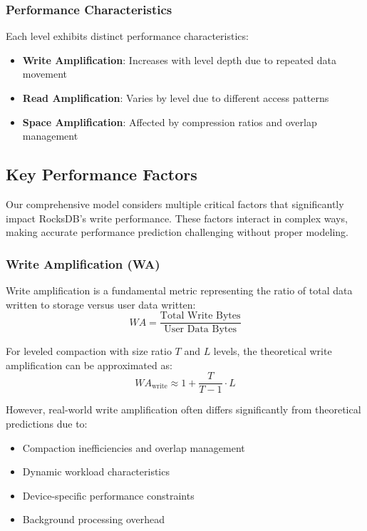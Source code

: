 \documentclass[11pt]{article}
\begin{document}
\subsubsection{Performance Characteristics}
Each level exhibits distinct performance characteristics:
\begin{itemize}
    \item \textbf{Write Amplification}: Increases with level depth due to repeated data movement
    \item \textbf{Read Amplification}: Varies by level due to different access patterns
    \item \textbf{Space Amplification}: Affected by compression ratios and overlap management
\end{itemize}

\subsection{Key Performance Factors}

Our comprehensive model considers multiple critical factors that significantly impact RocksDB's write performance. These factors interact in complex ways, making accurate performance prediction challenging without proper modeling.

\subsubsection{Write Amplification (WA)}
Write amplification is a fundamental metric representing the ratio of total data written to storage versus user data written:
\begin{equation}
WA = \frac{\text{Total Write Bytes}}{\text{User Data Bytes}}
\end{equation}

For leveled compaction with size ratio $T$ and $L$ levels, the theoretical write amplification can be approximated as:
\begin{equation}
WA_{\text{write}} \approx 1 + \frac{T}{T-1} \cdot L
\end{equation}

However, real-world write amplification often differs significantly from theoretical predictions due to:
\begin{itemize}
    \item Compaction inefficiencies and overlap management
    \item Dynamic workload characteristics
    \item Device-specific performance constraints
    \item Background processing overhead
\end{itemize}
\end{document}

